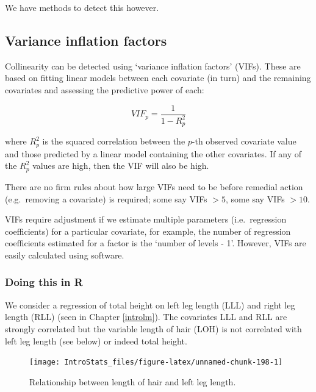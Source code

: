\documentclass[
  oneside]{krantz}
\begin{document}
We have methods to detect this however.

\hypertarget{variance-inflation-factors}{%
\subsection{Variance inflation factors}\label{variance-inflation-factors}}

Collinearity can be detected using `variance inflation factors' (VIFs). These are based on fitting linear models between each covariate (in turn) and the remaining covariates and assessing the predictive power of each:

\begin{equation}
VIF_p=\frac{1}{1-R_p^2}
\end{equation}

where \(R^2_p\) is the squared correlation between the \(p\)-th observed covariate value and those predicted by a linear model containing the other covariates. If any of the \(R^2_p\) values are high, then the VIF will also be high.

There are no firm rules about how large VIFs need to be before remedial action (e.g.~removing a covariate) is required; some say VIFs \(> 5\), some say VIFs \(>10\).

VIFs require adjustment if we estimate multiple parameters (i.e.~regression coefficients) for a particular covariate, for example, the number of regression coefficients estimated for a factor is the `number of levels - 1'. However, VIFs are easily calculated using software.

\hypertarget{doing-this-in-r-25}{%
\subsubsection{Doing this in R}\label{doing-this-in-r-25}}

We consider a regression of total height on left leg length (LLL) and right leg length (RLL) (seen in Chapter \ref{introlm}). The covariates LLL and RLL are strongly correlated but the variable length of hair (LOH) is not correlated with left leg length (see below) or indeed total height.

\begin{figure}

{\centering \texttt{[image: IntroStats\_files/figure-latex/unnamed-chunk-198-1]} 

}

\caption{Relationship between length of hair and left leg length.}\label{fig:unnamed-chunk-198}
\end{figure}
\end{document}
